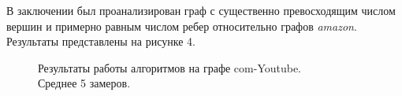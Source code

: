 В заключении был проанализирован граф с существенно превосходящим числом вершин и примерно равным числом ребер относительно графов 
\textit{amazon}. Результаты представлены на рисунке 4.

\begin{figure}[ht]
\begin{center}
\caption{\label{com-Youtube}Результаты работы алгоритмов на графе com-Youtube.\\Среднее 5 замеров.}
\end{center}
\end{figure}








